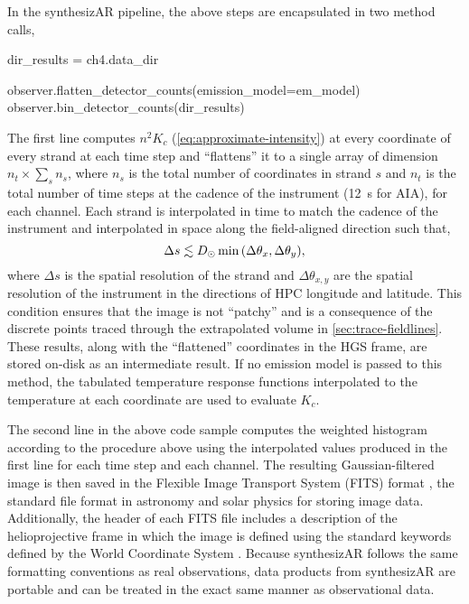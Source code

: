 In the synthesizAR pipeline, the above steps are encapsulated in two method calls,
\begin{pycode}[chapter4]
dir_results = ch4.data_dir
\end{pycode}
\begin{pyblock}[chapter4][baselinestretch=1,xleftmargin=3em]
observer.flatten_detector_counts(emission_model=em_model)
observer.bin_detector_counts(dir_results)
\end{pyblock}
The first line computes $n^2K_c$ (\autoref{eq:approximate-intensity}) at every coordinate of every strand at each time step and ``flattens'' it to a single array of dimension $n_t\times\sum_sn_s$, where $n_s$ is the total number of coordinates in strand $s$ and $n_t$ is the total number of time steps at the cadence of the instrument (\SI{12}{\second} for AIA), for each channel. Each strand is interpolated in time to match the cadence of the instrument and interpolated in space along the field-aligned direction such that,
\begin{equation}
    \Delta s \lesssim D_{\odot}\min{(\Delta\theta_x,\Delta\theta_y)},
\end{equation}
where $\Delta s$ is the spatial resolution of the strand and $\Delta\theta_{x,y}$ are the spatial resolution of the instrument in the directions of HPC longitude and latitude. This condition ensures that the image is not ``patchy'' and is a consequence of the discrete points traced through the extrapolated volume in \autoref{sec:trace-fieldlines}. These results, along with the ``flattened'' coordinates in the HGS frame, are stored on-disk as an intermediate result. If no emission model is passed to this method, the tabulated temperature response functions interpolated to the temperature at each coordinate are used to evaluate $K_c$.

The second line in the above code sample computes the weighted histogram according to the procedure above using the interpolated values produced in the first line for each time step and each channel. The resulting Gaussian-filtered image is then saved in the Flexible Image Transport System (FITS) format \citep{wells_fits_1981}, the standard file format in astronomy and solar physics for storing image data. Additionally, the header of each FITS file includes a description of the helioprojective frame in which the image is defined using the standard keywords defined by the World Coordinate System \citep{greisen_representations_2002}. Because synthesizAR follows the same formatting conventions as real observations, data products from synthesizAR are portable and can be treated in the exact same manner as observational data.

